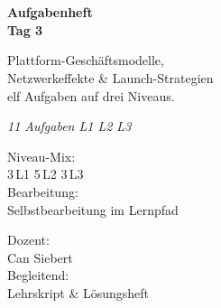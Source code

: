 \documentclass[11pt,a4paper,oneside]{article}
\newcommand{\caveatfontfallback}{\itshape}
\newcommand\caveatfont{\caveatfontfallback}%
\begin{document}
\begin{titlepage}
  \pagestyle{empty}
  \vspace*{1.5cm}
  \\[2pt]
  \noindent{\color{lpAccent}\rule{\linewidth}{1.2pt}}\\[4pt]

  \vspace{3cm}
  {\sffamily\fontsize{30}{34}\selectfont\bfseries\color{lpInk}Aufgabenheft\\Tag 3\par}

  \vspace{0.7cm}
  {\sffamily\large\color{lpGray}Plattform-Geschäftsmodelle,\\Netzwerkeffekte \& Launch-Strategien\\\textendash{} elf Aufgaben auf drei Niveaus.\par}

  \vspace{1.5cm}
  {\caveatfont\LARGE\color{lpAmber}11 Aufgaben \textperiodcentered{} L1 \textperiodcentered{} L2 \textperiodcentered{} L3}\par

  \vfill

  \noindent\begin{minipage}{0.55\linewidth}
    {\sffamily\footnotesize\color{lpGray}Niveau-Mix:}\\
    {\sffamily\small\color{lpInk}3\,\textsf{L1} \textperiodcentered{} 5\,\textsf{L2} \textperiodcentered{} 3\,\textsf{L3}}\\[10pt]
    {\sffamily\footnotesize\color{lpGray}Bearbeitung:}\\
    {\sffamily\small\color{lpInk}Selbstbearbeitung im Lernpfad}
  \end{minipage}\hfill
  \begin{minipage}{0.4\linewidth}
    \raggedleft
    {\sffamily\footnotesize\color{lpGray}Dozent:}\\
    {\sffamily\small\color{lpInk}Can Siebert}\\[10pt]
    {\sffamily\footnotesize\color{lpGray}Begleitend:}\\
    {\sffamily\small\color{lpInk}Lehrskript \& Lösungsheft}
  \end{minipage}

  \vspace{0.5cm}
  \noindent{\color{lpAccent}\rule{\linewidth}{0.6pt}}
\end{titlepage}
\end{document}
